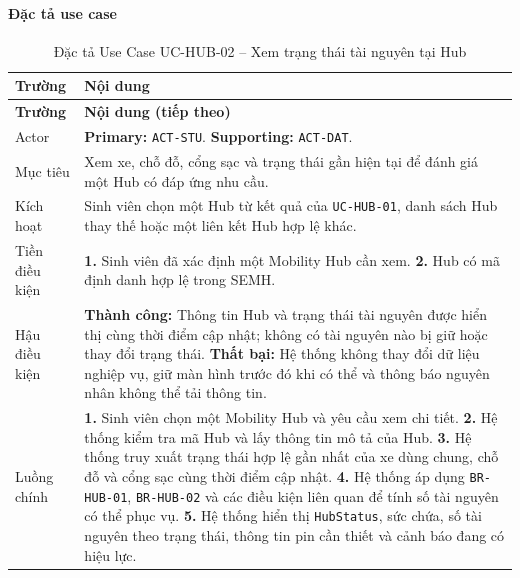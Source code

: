\paragraph{Đặc tả use case}
\small
\begin{longtable}{|L{26mm}|L{118mm}|}
  \caption{Đặc tả Use Case UC-HUB-02 -- Xem trạng thái tài nguyên tại Hub}\label{tab:spec-UC-HUB-02}\\
  \hline
  \centering\arraybackslash\textbf{Trường} & \centering\arraybackslash\textbf{Nội dung}\\
  \hline
  \endfirsthead
  \hline
  \centering\arraybackslash\textbf{Trường} & \centering\arraybackslash\textbf{Nội dung (tiếp theo)}\\
  \hline
  \endhead
  Actor & \textbf{Primary:} \texttt{ACT-STU}. \textbf{Supporting:} \texttt{ACT-DAT}.\\\hline
  Mục tiêu & Xem xe, chỗ đỗ, cổng sạc và trạng thái gần hiện tại để đánh giá một Hub có đáp ứng nhu cầu.\\\hline
  Kích hoạt & Sinh viên chọn một Hub từ kết quả của \texttt{UC-HUB-01}, danh sách Hub thay thế hoặc một liên kết Hub hợp lệ khác.\\\hline
  Tiền điều kiện &
    \textbf{1.} Sinh viên đã xác định một Mobility Hub cần xem.\newline
    \textbf{2.} Hub có mã định danh hợp lệ trong SEMH.\\\hline
  Hậu điều kiện &
    \textbf{Thành công:} Thông tin Hub và trạng thái tài nguyên được hiển thị cùng thời điểm cập nhật; không có tài nguyên nào bị giữ hoặc thay đổi trạng thái.\newline
    \textbf{Thất bại:} Hệ thống không thay đổi dữ liệu nghiệp vụ, giữ màn hình trước đó khi có thể và thông báo nguyên nhân không thể tải thông tin.\\\hline
  Luồng chính &
    \textbf{1.} Sinh viên chọn một Mobility Hub và yêu cầu xem chi tiết.\newline
    \textbf{2.} Hệ thống kiểm tra mã Hub và lấy thông tin mô tả của Hub.\newline
    \textbf{3.} Hệ thống truy xuất trạng thái hợp lệ gần nhất của xe dùng chung, chỗ đỗ và cổng sạc cùng thời điểm cập nhật.\newline
    \textbf{4.} Hệ thống áp dụng \texttt{BR-HUB-01}, \texttt{BR-HUB-02} và các điều kiện liên quan để tính số tài nguyên có thể phục vụ.\newline
    \textbf{5.} Hệ thống hiển thị \texttt{HubStatus}, sức chứa, số tài nguyên theo trạng thái, thông tin pin cần thiết và cảnh báo đang có hiệu lực.\newline

\end{longtable}
